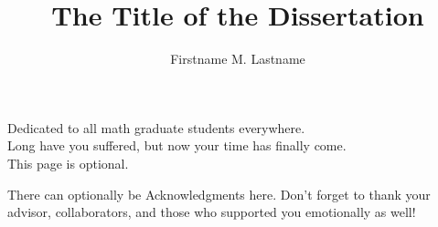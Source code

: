 \documentclass[final]{ukthesis} %
\begin{document}
\author{Firstname M. Lastname} %
\title{The Title of the Dissertation} %



\frontmatter %
\maketitle %

\begin{dedication} %
Dedicated to all math graduate students everywhere.\\
Long have you suffered, but now your time has finally come.\\
This page is optional.
\end{dedication}

\begin{acknowledgments} %
\hspace{\parindent}There can optionally be Acknowledgments here. Don't forget to thank your advisor, collaborators, and those who supported you emotionally as well!
\end{acknowledgments}

\tableofcontents*\clearpage %
\listoftables\clearpage %
\listoffigures\clearpage %

\mainmatter %

\end{document}
